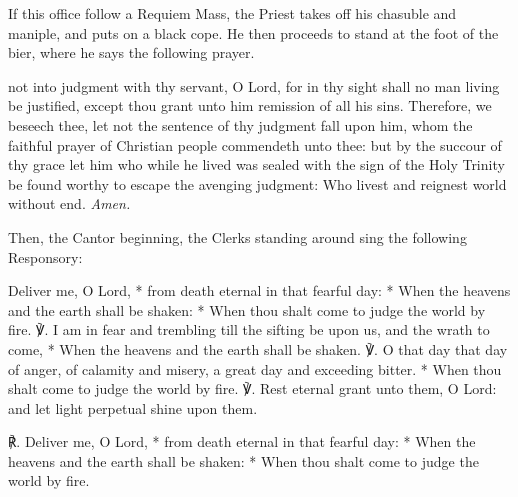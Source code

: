 \begin{rubric}
	If this office follow a Requiem Mass, the Priest takes off his chasuble and maniple, and puts on a black cope. He then proceeds to stand at the foot of the bier, where he says the following prayer.
\end{rubric}


 not into judgment with thy servant, O Lord, for in thy sight shall no man living be justified, except thou grant unto him remission of all his sins. Therefore, we beseech thee, let not the sentence of thy judgment fall upon him, whom the faithful prayer of Christian people commendeth unto thee: but by the succour of thy grace let him who while he lived was sealed with the sign of the Holy Trinity be found worthy to escape the avenging judgment: Who livest and reignest world without end. \textit{Amen.}

\begin{rubric}
    Then, the Cantor beginning, the Clerks standing around sing the following Responsory:
\end{rubric}\par\noindent
Deliver me, O Lord, * from death eternal in that fearful day: * When the heavens and the earth shall be shaken: * When thou shalt come to judge the world by fire. ℣. I am in fear and trembling till the sifting be upon us, and the wrath to come, * When the heavens and the earth shall be shaken. ℣. O that day that day of anger, of calamity and misery, a great day and exceeding bitter. * When thou shalt come to judge the world by fire. ℣. Rest eternal grant unto them, O Lord: and let light perpetual shine upon them.\par
℟. Deliver me, O Lord, * from death eternal in that fearful day: * When the heavens and the earth shall be shaken: * When thou shalt come to judge the world by fire.


